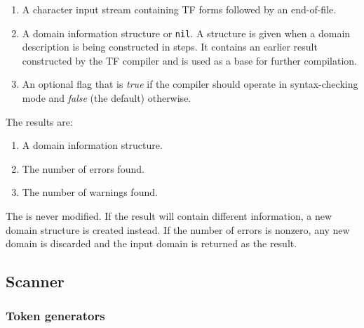 \begin{enumerate}
\item A character input stream containing TF forms followed
      by an end-of-file.
\item A domain information structure or {\tt nil}.  A structure is
      given when a domain description is being constructed in steps.
      It contains an earlier result constructed by the TF compiler 
      and is used as a base for further compilation.
\item An optional flag that is {\em true\/} if the compiler should
      operate in syntax-checking mode and {\em false\/} (the default)
      otherwise.
\end{enumerate}

\noindent
The results are:

\begin{enumerate}
\item A domain information structure.
\item The number of errors found.
\item The number of warnings found.
\end{enumerate}

The  is never modified.  If the result will contain
different information, a new domain structure is created instead. 
If the number of errors is nonzero, any new domain is discarded and
the input domain is returned as the result.





%


\subsection{Scanner}

\subsubsection{Token generators}


